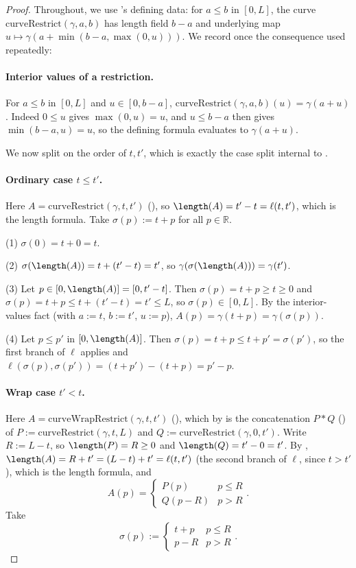 \begin{proof}
  Throughout, we use 's defining data: for $a \le b$ in $[0,L]$, the curve
  $\mathrm{curveRestrict}(\gamma,a,b)$ has length field $b-a$ and underlying map
  $u \mapsto \gamma(a + \min(b-a,\max(0,u)))$. We record once the consequence used repeatedly:

  \paragraph{Interior values of a restriction.} For $a \le b$ in $[0,L]$ and $u \in [0,b-a]$,
  $\mathrm{curveRestrict}(\gamma,a,b)(u) = \gamma(a+u)$. Indeed $0 \le u$ gives $\max(0,u) = u$,
  and $u \le b-a$ then gives $\min(b-a,u) = u$, so the defining formula evaluates to
  $\gamma(a+u)$.

  We now split on the order of $t,t'$, which is exactly the case split internal to
  .

  \paragraph{Ordinary case $t \le t'$.} Here $A = \mathrm{curveRestrict}(\gamma,t,t')$
  (), so $\length(A) = t'-t = \ell(t,t')$, which is the length formula. Take
  $\sigma(p) := t+p$ for all $p \in \mathbb{R}$.

  (1) $\sigma(0) = t+0 = t$.

  (2) $\sigma(\length(A)) = t + (t'-t) = t'$, so $\gamma(\sigma(\length(A))) = \gamma(t')$.

  (3) Let $p \in [0,\length(A)] = [0,t'-t]$. Then $\sigma(p) = t+p \ge t \ge 0$ and
  $\sigma(p) = t+p \le t + (t'-t) = t' \le L$, so $\sigma(p) \in [0,L]$. By the interior-values
  fact (with $a := t$, $b := t'$, $u := p$), $A(p) = \gamma(t+p) = \gamma(\sigma(p))$.

  (4) Let $p \le p'$ in $[0,\length(A)]$. Then $\sigma(p) = t+p \le t+p' = \sigma(p')$, so the
  first branch of $\ell$ applies and $\ell(\sigma(p),\sigma(p')) = (t+p')-(t+p) = p'-p$.

  \paragraph{Wrap case $t' < t$.} Here $A = \mathrm{curveWrapRestrict}(\gamma,t,t')$
  (), which by  is the concatenation
  $P * Q$ () of $P := \mathrm{curveRestrict}(\gamma,t,L)$ and
  $Q := \mathrm{curveRestrict}(\gamma,0,t')$. Write $R := L - t$, so $\length(P) = R \ge 0$ and
  $\length(Q) = t' - 0 = t'$. By , $\length(A) = R + t' = (L-t)+t' =
  \ell(t,t')$ (the second branch of $\ell$, since $t > t'$), which is the length formula, and
  \[
    A(p) = \begin{cases} P(p) & p \le R \\ Q(p-R) & p > R\end{cases}
    .
  \]
  Take
  \[
    \sigma(p) := \begin{cases} t+p & p \le R \\ p-R & p > R\end{cases}
    .
  \]


\end{proof}
